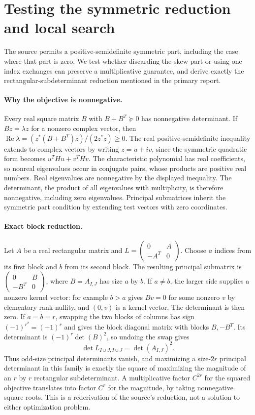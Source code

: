 \documentclass[11pt]{article}
\begin{document}
\section{Testing the symmetric reduction and local search}
The source permits a positive-semidefinite symmetric part, including
the case where that part is zero. We test whether discarding the
skew part or using one-index exchanges can preserve a multiplicative
guarantee, and derive exactly the rectangular-subdeterminant reduction
mentioned in the primary report.

\paragraph{Why the objective is nonnegative.}
Every real square matrix $B$ with $B+B^T\succeq0$ has
nonnegative determinant. If $Bz=\lambda z$ for a nonzero
complex vector, then
$\operatorname{Re}\lambda=(z^*(B+B^T)z)/(2z^*z)\ge0$.
The real positive-semidefinite inequality extends to complex vectors
by writing $z=u+iv$, since the symmetric quadratic form becomes
$u^THu+v^THv$. The characteristic polynomial has real
coefficients, so nonreal eigenvalues occur in conjugate pairs,
whose products are positive real numbers. Real eigenvalues are
nonnegative by the displayed inequality. The determinant, the product
of all eigenvalues with multiplicity, is therefore nonnegative,
including zero eigenvalues. Principal submatrices inherit the symmetric
part condition by extending test vectors with zero coordinates.

\paragraph{Exact block reduction.}
Let $A$ be a real rectangular matrix and
$L=\left(\begin{smallmatrix}0&A\\-A^T&0\end{smallmatrix}\right)$.
Choose $a$ indices from its first block and $b$ from its
second block. The resulting principal submatrix is
$\left(\begin{smallmatrix}0&B\\-B^T&0\end{smallmatrix}\right)$,
where $B=A_{I,J}$ has size $a$ by $b$.
If $a\ne b$, the larger side supplies a nonzero kernel vector:
for example $b>a$ gives $Bv=0$ for some nonzero $v$ by
elementary rank-nullity, and $(0,v)$ is a kernel vector.
The determinant is then zero. If $a=b=r$, swapping the two
blocks of columns has sign $(-1)^{r^2}=(-1)^r$ and gives
the block diagonal matrix with blocks $B,-B^T$. Its determinant
is $(-1)^r\det(B)^2$, so undoing the swap gives
\[
\det L_{I\cup J,I\cup J}=\det(A_{I,J})^2.
\]
Thus odd-size principal determinants vanish, and maximizing a
size-$2r$ principal determinant in this family is exactly the
square of maximizing the magnitude of an $r$ by $r$
rectangular subdeterminant. A multiplicative factor $C^{2r}$
for the squared objective translates into factor $C^r$ for
the magnitude, by taking nonnegative square roots. This is a
rederivation of the source's reduction, not a solution to either
optimization problem.
\end{document}
